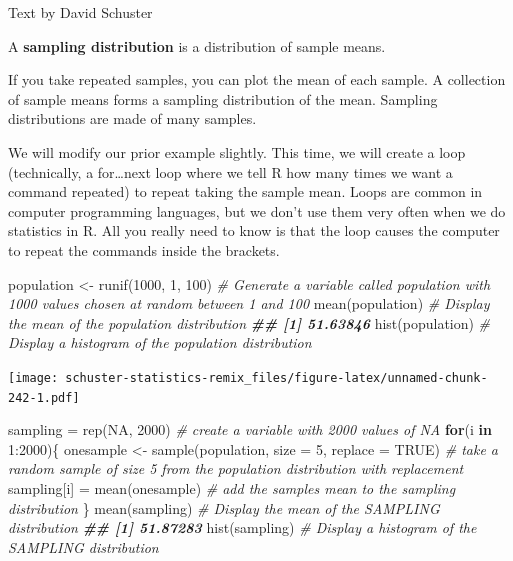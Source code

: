 \documentclass[
]{book}
\newenvironment{Shaded}{\begin{snugshade}}{\end{snugshade}}
\newcommand{\AttributeTok}[1]{\textcolor[rgb]{0.77,0.63,0.00}{#1}}
\newcommand{\CommentTok}[1]{\textcolor[rgb]{0.56,0.35,0.01}{\textit{#1}}}
\newcommand{\ConstantTok}[1]{\textcolor[rgb]{0.00,0.00,0.00}{#1}}
\newcommand{\ControlFlowTok}[1]{\textcolor[rgb]{0.13,0.29,0.53}{\textbf{#1}}}
\newcommand{\DecValTok}[1]{\textcolor[rgb]{0.00,0.00,0.81}{#1}}
\newcommand{\DocumentationTok}[1]{\textcolor[rgb]{0.56,0.35,0.01}{\textbf{\textit{#1}}}}
\newcommand{\FunctionTok}[1]{\textcolor[rgb]{0.00,0.00,0.00}{#1}}
\newcommand{\NormalTok}[1]{#1}
\newcommand{\OtherTok}[1]{\textcolor[rgb]{0.56,0.35,0.01}{#1}}
\newcommand{\SpecialCharTok}[1]{\textcolor[rgb]{0.00,0.00,0.00}{#1}}
\begin{document}
Text by David Schuster

A \textbf{sampling distribution} is a distribution of sample means.

If you take repeated samples, you can plot the mean of each sample. A collection of sample means forms a sampling distribution of the mean. Sampling distributions are made of many samples.

We will modify our prior example slightly. This time, we will create a loop (technically, a for\ldots next loop where we tell R how many times we want a command repeated) to repeat taking the sample mean. Loops are common in computer programming languages, but we don't use them very often when we do statistics in R. All you really need to know is that the loop causes the computer to repeat the commands inside the brackets.

\begin{Shaded}
\begin{Highlighting}[]
\NormalTok{population }\OtherTok{\textless{}{-}} \FunctionTok{runif}\NormalTok{(}\DecValTok{1000}\NormalTok{, }\DecValTok{1}\NormalTok{, }\DecValTok{100}\NormalTok{) }\CommentTok{\# Generate a variable called \textquotesingle{}population\textquotesingle{} with 1000 values chosen at random between 1 and 100}
\FunctionTok{mean}\NormalTok{(population) }\CommentTok{\# Display the mean of the population distribution}
\DocumentationTok{\#\# [1] 51.63846}
\FunctionTok{hist}\NormalTok{(population) }\CommentTok{\# Display a histogram of the population distribution}
\end{Highlighting}
\end{Shaded}

\texttt{[image: schuster-statistics-remix\_files/figure-latex/unnamed-chunk-242-1.pdf]}

\begin{Shaded}
\begin{Highlighting}[]
\NormalTok{sampling }\OtherTok{=} \FunctionTok{rep}\NormalTok{(}\ConstantTok{NA}\NormalTok{, }\DecValTok{2000}\NormalTok{) }\CommentTok{\# create a variable with 2000 values of NA}
\ControlFlowTok{for}\NormalTok{(i }\ControlFlowTok{in} \DecValTok{1}\SpecialCharTok{:}\DecValTok{2000}\NormalTok{)\{}
\NormalTok{  onesample }\OtherTok{\textless{}{-}} \FunctionTok{sample}\NormalTok{(population, }\AttributeTok{size =} \DecValTok{5}\NormalTok{, }\AttributeTok{replace =} \ConstantTok{TRUE}\NormalTok{) }\CommentTok{\# take a random sample of size 5 from the population distribution with replacement  }
\NormalTok{  sampling[i] }\OtherTok{=} \FunctionTok{mean}\NormalTok{(onesample) }\CommentTok{\# add the sample\textquotesingle{}s mean to the sampling distribution}
\NormalTok{\}}
\FunctionTok{mean}\NormalTok{(sampling) }\CommentTok{\# Display the mean of the SAMPLING distribution}
\DocumentationTok{\#\# [1] 51.87283}
\FunctionTok{hist}\NormalTok{(sampling) }\CommentTok{\# Display a histogram of the SAMPLING distribution}
\end{Highlighting}
\end{Shaded}
\end{document}
